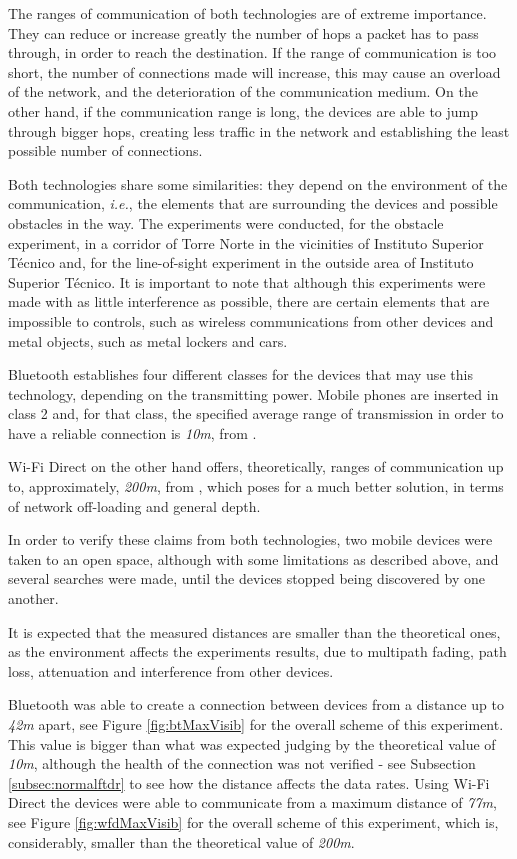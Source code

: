 The ranges of communication of both technologies are of extreme importance. They can reduce or increase greatly the number of hops a packet has to pass through, in order to reach the destination. If the range of communication is too short, the number of connections made will increase, this may cause an overload of the network, and the deterioration of the communication medium. On the other hand, if the communication range is long, the devices are able to jump through bigger hops, creating less traffic in the network and establishing the least possible number of connections.

Both technologies share some similarities: they depend on the environment of the communication, \textit{i.e.}, the elements that are surrounding the devices and possible obstacles in the way. The experiments were conducted, for the obstacle experiment, in a corridor of Torre Norte in the vicinities of Instituto Superior Técnico and, for the line-of-sight experiment in the outside area of Instituto Superior Técnico. It is important to note that although this experiments were made with as little interference as possible, there are certain elements that are impossible to controls, such as wireless communications from other devices and metal objects, such as metal lockers and cars.

Bluetooth establishes four different classes for the devices that may use this technology, depending on the transmitting power. Mobile phones are inserted in class 2 and, for that class, the specified average range of transmission in order to have a reliable connection is \textit{10m}, from \cite{bluetooth}.

Wi-Fi Direct on the other hand offers, theoretically, ranges of communication up to, approximately, \textit{200m}, from \cite{wfdrange}, which poses for a much better solution, in terms of network off-loading and general depth.

In order to verify these claims from both technologies, two mobile devices were taken to an open space, although with some limitations as described above, and several searches were made, until the devices stopped being discovered by one another.

It is expected that the measured distances are smaller than the theoretical ones, as the environment affects the experiments results, due to multipath fading, path loss, attenuation and interference from other devices.

Bluetooth was able to create a connection between devices from a distance up to \textit{42m} apart, see Figure \ref{fig:btMaxVisib} for the overall scheme of this experiment. This value is bigger than what was expected judging by the theoretical value of \textit{10m}, although the health of the connection was not verified - see Subsection \ref{subsec:normalftdr} to see how the distance affects the data rates. Using Wi-Fi Direct the devices were able to communicate from a maximum distance of \textit{77m}, see Figure \ref{fig:wfdMaxVisib} for the overall scheme of this experiment, which is, considerably, smaller than the theoretical value of \textit{200m}.

